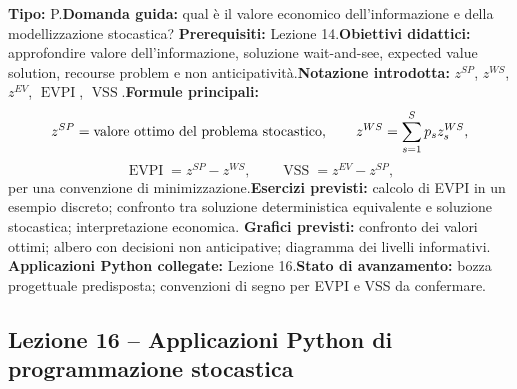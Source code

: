 \documentclass[12pt,a4paper]{article}%
\begin{document}
\textbf{Tipo:} P.\newline\textbf{Domanda guida:} qual \`{e} il valore
economico dell'informazione e della modellizzazione stocastica?\newline%
\textbf{Prerequisiti:} Lezione 14.\newline\textbf{Obiettivi didattici:}
approfondire valore dell'informazione, soluzione wait-and-see, expected value
solution, recourse problem e non anticipativit\`{a}.\newline\textbf{Notazione
introdotta:} $z^{SP}$, $z^{WS}$, $z^{EV}$, $\operatorname{EVPI}$,
$\operatorname{VSS}$.\newline\textbf{Formule principali:}
\[
z^{SP}=\hbox{valore ottimo del problema stocastico}, \qquad z^{WS}=\sum
_{s=1}^{S}p_{s} z_{s}^{WS},
\]
\[
\operatorname{EVPI}=z^{SP}-z^{WS}, \qquad\operatorname{VSS}=z^{EV}-z^{SP},
\]
per una convenzione di minimizzazione.\newline\textbf{Esercizi previsti:}
calcolo di EVPI in un esempio discreto; confronto tra soluzione deterministica
equivalente e soluzione stocastica; interpretazione economica.\newline%
\textbf{Grafici previsti:} confronto dei valori ottimi; albero con decisioni
non anticipative; diagramma dei livelli informativi.\newline%
\textbf{Applicazioni Python collegate:} Lezione 16.\newline\textbf{Stato di
avanzamento:} bozza progettuale predisposta; convenzioni di segno per EVPI e
VSS da confermare.

\subsection{Lezione 16 -- Applicazioni Python di programmazione stocastica}
\end{document}
